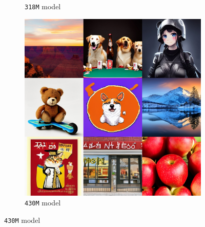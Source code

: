 \begin{figure}[htbp]
\begin{subfigure}[b]{0.32\textwidth}
    \caption{\texttt{318M} model}
    \end{subfigure}
    \begin{subfigure}[b]{0.32\textwidth}
    \centering
    \includegraphics[width=\textwidth]{cp2/figures/t2i/c224.jpg}
    \caption{\texttt{430M} model}
    \end{subfigure}
    \hfill
    

\end{figure}
